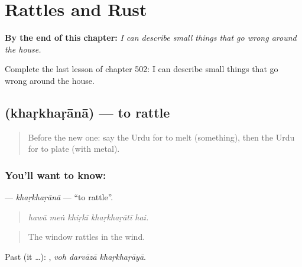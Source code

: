
\chapter{Rattles and Rust}
\label{ch:ur-rattles-and-rust}

\begin{chapteropening}
\textbf{By the end of this chapter:} \emph{I can describe small things that go wrong around the house.}

Complete the last lesson of chapter 502: I can describe small things that go wrong around the house.
\end{chapteropening}

\section[\texorpdfstring{\ur{کھڑکھڑانا} (khaṛkhaṛānā)}{کھڑکھڑانا (khaṛkhaṛānā)}]{ (khaṛkhaṛānā) — to rattle}

\label{lesson:UR-C502-kharkharana}



\begin{quote}
Before the new one: say the Urdu for to melt (something), then the Urdu for to plate (with metal).
\end{quote}

\subsection*{You'll want to know: }
\textbf{} — \emph{khaṛkhaṛānā} — \textquotedblleft{}to rattle\textquotedblright{}.

\begin{quote}
    
\end{quote}

\begin{quote}
\emph{hawā meṅ khiṛkī khaṛkhaṛātī hai.}
\end{quote}

\begin{quote}
The window rattles in the wind.
\end{quote}

Past (it …):   , \emph{voh darvāzā khaṛkhaṛāyā}.

